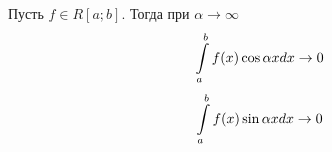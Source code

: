 \begin{lemma}[Римана]
Пусть $f\in R[a;b]$.
Тогда при $\alpha \to\infty$
$$
\int\limits_a^b f(x) \cos \alpha x dx \to 0
$$
$$
\int\limits_a^b f(x) \sin \alpha x dx \to 0
$$
\end{lemma}
